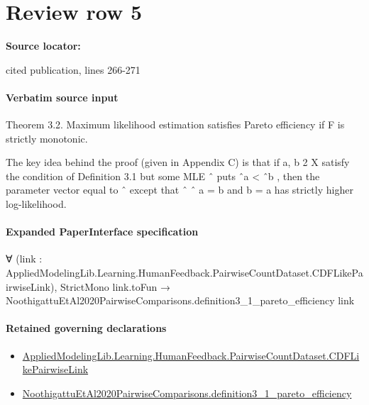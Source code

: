 \documentclass[10pt]{article}
\begin{document}
\section*{Review row 5}
\textbf{Source locator:} {\footnotesize\raggedright cited publication, lines 266-\allowbreak{}271\par}
\paragraph{Verbatim source input}
\begin{ReviewVerbatim}
Theorem 3.2. Maximum likelihood estimation satisfies Pareto efficiency if F is strictly monotonic.

The key idea behind the proof (given in Appendix C) is that if a, b 2 X satisfy the condition of
Definition 3.1 but some MLE ˆ puts ˆa < ˆb , then the parameter vector equal to ˆ except that
      ˆ             ˆ
 a = b and b = a has strictly higher log-likelihood.
\end{ReviewVerbatim}



\paragraph{Expanded PaperInterface specification}
\begin{ReviewVerbatim}
∀ (link : AppliedModelingLib.Learning.HumanFeedback.PairwiseCountDataset.CDFLikePairwiseLink),
  StrictMono link.toFun → NoothigattuEtAl2020PairwiseComparisons.definition3_1_pareto_efficiency link
\end{ReviewVerbatim}

\paragraph{Retained governing declarations}
\begin{itemize}\raggedright
\item \hyperlink{governing-declaration-3449f3559185d0fd}{Applied\allowbreak{}Modeling\allowbreak{}Lib.\allowbreak{}Learning.\allowbreak{}Human\allowbreak{}Feedback.\allowbreak{}Pairwise\allowbreak{}Count\allowbreak{}Dataset.\allowbreak{}CDF\allowbreak{}Like\allowbreak{}Pairwise\allowbreak{}Link}
\item \hyperlink{paper-prerequisite-07405caa9661e20f}{Noothigattu\allowbreak{}Et\allowbreak{}Al2020\allowbreak{}Pairwise\allowbreak{}Comparisons.\allowbreak{}definition3\_\allowbreak{}1\_\allowbreak{}pareto\_\allowbreak{}efficiency}
\end{itemize}
\end{document}
